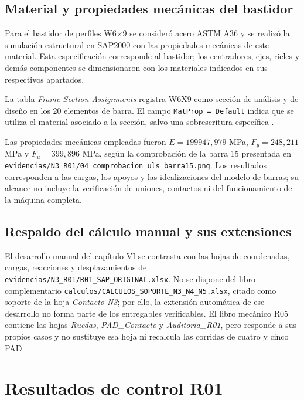 \subsection{Material y propiedades mecánicas del bastidor}
\label{sec:material-trazabilidad}

Para el bastidor de perfiles W6×9 se consideró acero ASTM A36 y se realizó la simulación estructural en SAP2000 con las propiedades mecánicas de este material. Esta especificación corresponde al bastidor; los centradores, ejes, rieles y demás componentes se dimensionaron con los materiales indicados en sus respectivos apartados.

La tabla \emph{Frame Section Assignments} registra W6X9 como sección de análisis y de diseño en los 20 elementos de barra. El campo \texttt{MatProp = Default} indica que se utiliza el material asociado a la sección, salvo una sobrescritura específica \cite{csi_material_overwrites}.

Las propiedades mecánicas empleadas fueron $E=199947{,}979$ MPa, $F_y=248{,}211$ MPa y $F_u=399{,}896$ MPa, según la comprobación de la barra 15 presentada en \nolinkurl{evidencias/N3_R01/04_comprobacion_uls_barra15.png}. Los resultados corresponden a las cargas, los apoyos y las idealizaciones del modelo de barras; su alcance no incluye la verificación de uniones, contactos ni del funcionamiento de la máquina completa.

\subsection{Respaldo del cálculo manual y sus extensiones}
\label{sec:respaldo-complementario}

El desarrollo manual del capítulo VI se contrasta con las hojas de coordenadas, cargas, reacciones y desplazamientos de \nolinkurl{evidencias/N3_R01/R01_SAP_ORIGINAL.xlsx}. No se dispone del libro complementario \nolinkurl{calculos/CALCULOS_SOPORTE_N3_N4_N5.xlsx}, citado como soporte de la hoja \emph{Contacto N3}; por ello, la extensión automática de ese desarrollo no forma parte de los entregables verificables. El libro mecánico R05 contiene las hojas \emph{Ruedas}, \emph{PAD\_Contacto} y \emph{Auditoria\_R01}, pero responde a sus propios casos y no sustituye esa hoja ni recalcula las corridas de cuatro y cinco PAD.

\section{Resultados de control R01}


